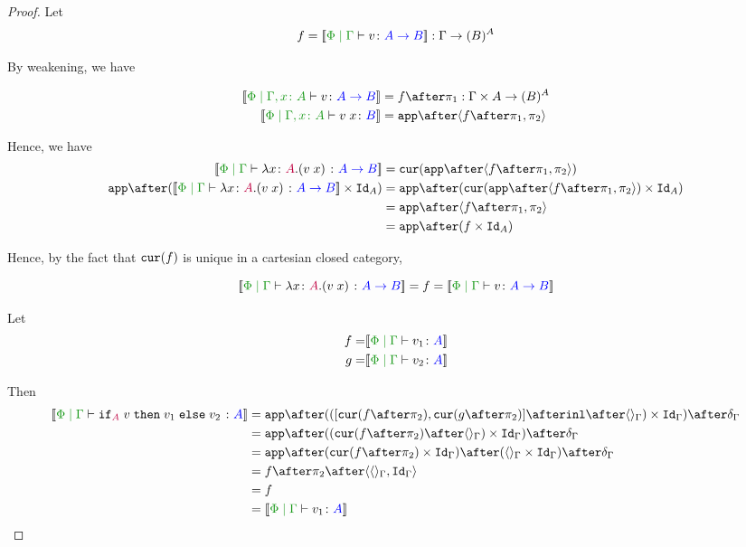 \documentclass{report}
\begin{document}
\begin{framed}
\begin{proof}
        \case{\eqeta}
        Let 
        \begin{equation}
            f = \deno{\gpetyperelation{v}{\ab}} : \G \rightarrow (B)^{A}
        \end{equation}
        
        By weakening, we have
        
        \begin{align*}
            \deno{\etyperelation{\P}{\gax}{v}{\ab}} & = f \after \p : \G \times A \rightarrow (B)^A \\
            \deno{\etyperelation{\P}{\gax}{\apply{v}{x}}{B}} & = \app\after\pr{f \after \p}{\pp} \\
        \end{align*}
        
        Hence, we have 
        \begin{align*}
                \deno{\gpetyperelation{\lam{x}{A}{(\apply{v}{x})}}{\ab}} & = \cur{\app\after\pr{f \after \p}{\pp}}\\
                \app\after(\deno{\gpetyperelation{\lam{x}{A}{(\apply{v}{x})}}{\ab}} \times \Id{A}) & = \app \after(\cur{\app\after\pr{f \after \p}{\pp}}\times \Id{A})\\
                & = \app \after\pr{f\after\p}{\pp}\\
                & = \app\after(f\times\Id{A})
        \end{align*}
        
        Hence, by the fact that $\texttt{cur}(f)$ is unique in a cartesian closed category, 
        
        \begin{equation}
            \deno{\gpetyperelation{\lam{x}{A}{(\apply{v}{x})}}{\ab}} = f =\deno{\gpetyperelation{v}{\ab}}
        \end{equation}
        
        \case{\eqiftrue}
        Let
        \begin{align*}
            f = &\deno{\gpetyperelation{v_1}{A}}\\
            g = &\deno{\gpetyperelation{v_2}{A}}\\
        \end{align*}
        
        Then
        \begin{align*}
                \deno{\gpetyperelation{\pifthenelse{A}{v}{v_1}{v_2}}{A}} & = \ifMorph{\inl\after\term{\G}}{f}{g} \\
                & = \app\after((\cur{f\after\pp}\after\term{\G})\times\idg)\after\diag{\G}\\
                & = \app\after(\cur{f\after\pp}\times\idg)\after(\term{\G}\times\idg)\after\diag{\G}\\
                & = f\after\pp\after\pr{\term{\G}}{\idg}\\
                & = f \\
                & = \deno{\gpetyperelation{v_1}{A}}\\
        \end{align*}
        

\end{proof}
\end{framed}
\end{document}
